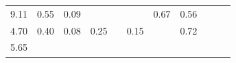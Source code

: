 \begin{refsection}[referencesCh3]
\begin{table}
\begin{adjustbox}{scale=0.8,center}
\begin{tabular}{@{}ccccccccccc@{}}
		9.11                                                         & 0.55                                                & 0.09                                                &                                                     &                                                     &                                                      & 0.67                                                & 0.56                                                  &                                                         &                                                      & \cite{Martin2}                                                                    \\
		4.70                                                         & 0.40                                                & 0.08                                                & 0.25                                                &                                                     & 0.15                                                 &                                                     & 0.72                                                  &                                                         &                                                      & \cite{Normak}                                                              \\
		5.65                                                         &                                                     &                                                     &                                                     &                                                     &                                                      &                                                     &                                                       &                                                         &                                                      & \cite{Xia}                                                                   \\ \bottomrule
	\end{tabular}
	\end{adjustbox}
\end{table}

\newpage


\end{refsection}
